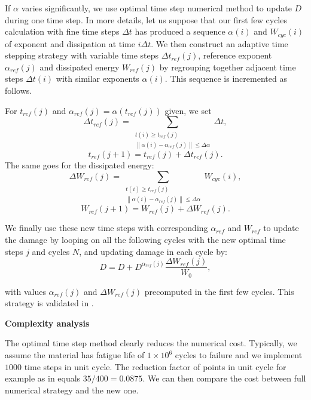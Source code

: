 If $\alpha$ varies significantly, we use optimal time step numerical method to update $D$ during one time step. In more details, let us suppose that our first few cycles calculation with fine time steps $\Delta t$ has produced a sequence $\alpha(i)$ and $W_{cyc}(i)$ of exponent and dissipation at time $i\Delta t$. We then construct an adaptive time stepping strategy with variable time steps $\Delta t_{ref}(j)$, reference exponent $\alpha_{ref}(j)$ and dissipated energy $W_{ref}(j)$ by regrouping together adjacent time steps $\Delta t(i)$ with similar exponents $\alpha(i)$. This sequence is incremented as follows.


For $t_{ref}(j)$ and $\alpha_{ref}(j)=\alpha(t_{ref}(j))$ given, we set
$$\Delta t_{ref}(j)=\sum_{\substack{t(i)\geqslant t_{ref}(j)\\\left\| \alpha(i)-\alpha_{ref}(j)\right\|\leqslant \Delta\alpha }}\Delta t,$$ $$t_{ref}(j+1)=t_{ref}(j)+\Delta t_{ref}(j).$$
The same goes for the dissipated energy:
$$\Delta W_{ref}(j)=\sum_{\substack{t(i)\geqslant t_{ref}(j)\\\left\| \alpha(i)-\alpha_{ref}(j)\right\|\leqslant \Delta\alpha} }W_{cyc}(i) ,$$ $$W_{ref}(j+1)=W_{ref}(j)+\Delta W_{ref}(j).$$

We finally use these new time steps with corresponding $\alpha_{ref}$ and $W_{ref}$ to update the damage by looping on all the following cycles with the new optimal time steps $j$ and cycles $N$, and updating damage in each cycle by:
\begin{equation}
D=D+D^{\alpha_{ref}(j)}\dfrac{\Delta W_{ref}(j)}{W_0},
\label{eq.optimal}
\end{equation}

with values $\alpha_{ref}(j)$ and $\Delta W_{ref}(j)$ precomputed in the first few cycles. This strategy is validated in .

\vspace{6pt}
\textbf{Complexity analysis}
\vspace{6pt}

The optimal time step method clearly reduces the numerical cost. Typically, we assume the material has fatigue life of $1\times10^{6}$ cycles to failure and we implement $1000$ time steps in unit cycle. The reduction factor of points in unit cycle for example as in  equals $35/400=0.0875$. We can then compare the cost between full numerical strategy and the new one.

